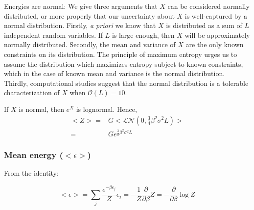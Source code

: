 \documentclass{article}
\newcommand{\ep}{\epsilon}
\begin{document}
Energies are normal: We give three arguments that
$X$ can be considered normally distributed, or more properly that our
uncertainty about $X$ is well-captured by a normal distribution.
Firstly, \textit{a priori} we know that $X$ is distributed as a sum of
$L$ independent random variables.  If $L$ is large enough, then $X$
will be approximately normally distributed.  Secondly, the mean and
variance of $X$ are the only known constraints on its distribution.
The principle of maximum entropy urges us to assume the distribution
which maximizes entropy subject to known constraints, which in the
case of known mean and variance is the normal distribution.  Thirdly,
computational studies suggest that the normal distribution is a
tolerable characterization of $X$ when $\mathcal{O}(L) = 10$.

If $X$ is normal, then $e^X$ is lognormal.  Hence, 
\begin{align*}
  <Z> =& G<\mathcal{LN}(0,\frac{3}{4}\beta^2\sigma^2L)>\\
  =&Ge^{\frac{3}{8}\beta^2\sigma^2L}
\end{align*}


\subsubsection{Mean energy ($<\ep>$)}

From the identity:

\begin{equation}
  \label{eq:dbdz}
  <\ep>=\sum_j\frac{e^{-\beta\ep_j}}{Z}\ep_j = -\frac{1}{Z}\frac{\partial}{\partial\beta}Z = -\frac{\partial}{\partial\beta}\log Z
\end{equation}



{}  \newpage
\end{document}
